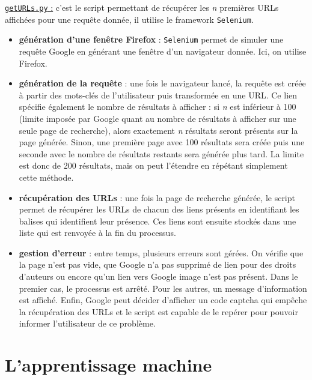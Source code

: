 \documentclass[12pt]{article}
\begin{document}
\newpage
\underline{\texttt{getURLs.py} :} c'est le script permettant de récupérer les \textit{n} premières URLs affichées pour une requête donnée, il utilise le framework \texttt{Selenium}.
\begin{itemize}
	\item \textbf{génération d'une fenêtre Firefox} :  \texttt{Selenium} permet de simuler une requête Google en générant une fenêtre d'un navigateur donnée. Ici, on utilise Firefox.
	\item \textbf{génération de la requête} : une fois le navigateur lancé, la requête est créée à partir des mots-clés de l'utilisateur puis transformée en une URL. Ce lien spécifie également le nombre de résultats à afficher : si \textit{n} est inférieur à 100 (limite imposée par Google quant au nombre de résultats à afficher sur une seule page de recherche), alors exactement \textit{n} résultats seront présents sur la page générée. Sinon, une première page avec 100 résultats sera créée puis une seconde avec le nombre de résultats restants sera générée plus tard. La limite est donc de 200 résultats, mais on peut l'étendre en répétant simplement cette méthode.
	\item \textbf{récupération des URLs} : une fois la page de recherche générée, le script permet de récupérer les URLs de chacun des liens présents en identifiant les balises qui identifient leur présence. Ces liens sont ensuite stockés dans une liste qui est renvoyée à la fin du processus.
	\item \textbf{gestion d'erreur} : entre temps, plusieurs erreurs sont gérées. On vérifie que la page n'est pas vide, que Google n'a pas supprimé de lien pour des droits d'auteurs ou encore qu'un lien vers Google image n'est pas présent. Dans le premier cas, le processus est arrêté. Pour les autres, un message d'information est affiché. Enfin, Google peut décider d'afficher un code captcha qui empêche la récupération des URLs et le script est capable de le repérer pour pouvoir informer l'utilisateur de ce problème.
\end{itemize}


\newpage
\section{L'apprentissage machine}
\end{document}
